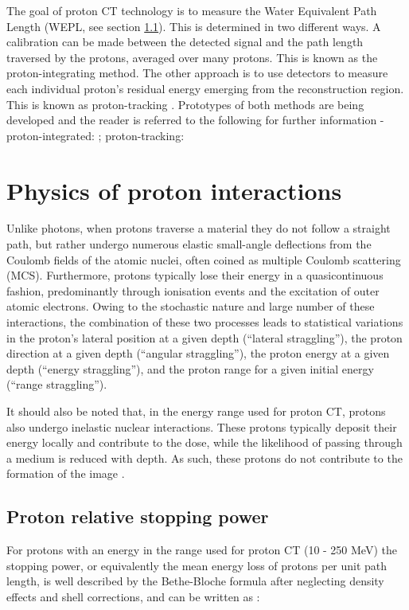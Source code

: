 \documentclass[11pt,a4paper]{article}
\begin{document}
The goal of proton CT technology is to measure the Water Equivalent Path Length (WEPL, see section \ref{sec:WEPL}). This is determined in two different ways. A calibration can be made between the detected signal and the path length traversed by the protons, averaged over many protons. This is known as the proton-integrating method. The other approach is to use detectors to measure each individual proton's residual energy emerging from the reconstruction region. This is known as proton-tracking \cite{poludniowski2015proton}. Prototypes of both methods are being developed and the reader is referred to the following for further information - proton-integrated: \cite{zygmanski2000measurement, testa2013proton, seco2011proof}; proton-tracking: \cite{sadrozinski2013development, johnsonresults}

\section{Physics of proton interactions}
\label{app:protoninteractions}
Unlike photons, when protons traverse a material they do not follow a straight path, but rather undergo numerous elastic small-angle deflections from the Coulomb fields of the atomic nuclei, often coined as multiple Coulomb scattering (MCS). Furthermore, protons typically lose their energy in a quasicontinuous fashion, predominantly through ionisation events and the excitation of outer atomic electrons. Owing to the stochastic nature and large number of these interactions, the combination of these two processes leads to statistical variations in the proton's lateral position at a given depth (``lateral straggling''), the proton direction at a given depth (``angular straggling''), the proton energy at a given depth (``energy straggling''), and the proton range for a given initial energy (``range straggling'').

It should also be noted that, in the energy range used for proton CT, protons also undergo inelastic nuclear interactions. These protons typically deposit their energy locally and contribute to the dose, while the likelihood of passing through a medium is reduced with depth. As such, these protons do not contribute to the formation of the image \cite{schulte2005density}.

\subsection{Proton relative stopping power}
\label{sec:WEPL}
For protons with an energy in the range used for proton CT (10 - 250 MeV) the stopping power, or equivalently the mean energy loss of protons per unit path length, is well described by the Bethe-Bloche formula after neglecting density effects and shell corrections, and can be written as \cite{nakamura2010review}:
\end{document}
